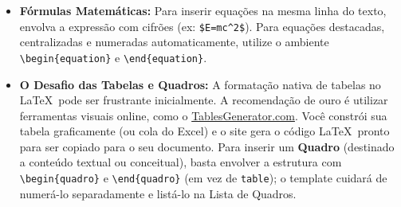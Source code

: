 \documentclass[12pt, a4paper]{article}
\begin{document}
\begin{itemize}
    \item \textbf{Fórmulas Matemáticas:} Para inserir equações na mesma linha do texto, envolva a expressão com cifrões (ex: \texttt{\$E=mc\textasciicircum 2\$}). Para equações destacadas, centralizadas e numeradas automaticamente, utilize o ambiente \texttt{\textbackslash begin\{equation\}} e \texttt{\textbackslash end\{equation\}}.
    \item \textbf{O Desafio das Tabelas e Quadros:} A formatação nativa de tabelas no \LaTeX \ pode ser frustrante inicialmente. A recomendação de ouro é utilizar ferramentas visuais online, como o \href{https://www.tablesgenerator.com/}{TablesGenerator.com}. Você constrói sua tabela graficamente (ou cola do Excel) e o site gera o código \LaTeX \ pronto para ser copiado para o seu documento. Para inserir um \textbf{Quadro} (destinado a conteúdo textual ou conceitual), basta envolver a estrutura com \texttt{\textbackslash begin\{quadro\}} e \texttt{\textbackslash end\{quadro\}} (em vez de \texttt{table}); o template cuidará de numerá-lo separadamente e listá-lo na Lista de Quadros.


\end{itemize}
\end{document}
